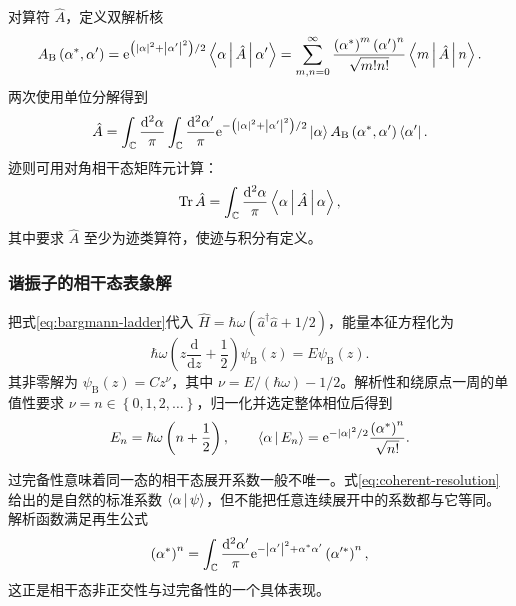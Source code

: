 对算符 $\hat A$，定义双解析核
\begin{equation}
A_{\mathrm{B}}\left(\alpha^*,\alpha'\right)
=\mathrm{e}^{\left(\left|\alpha\right|^2+\left|\alpha'\right|^2\right)/2}
\Braket{\alpha|\hat A|\alpha'}
=\sum_{m,n=0}^{\infty}\frac{\left(\alpha^*\right)^m\left(\alpha'\right)^n}{\sqrt{m!n!}}
\Braket{m|\hat A|n}.
\end{equation}
两次使用单位分解得到
\begin{equation}
\hat A=\int_{\mathbb{C}}\frac{\mathrm{d}^2\alpha}{\pi}
\int_{\mathbb{C}}\frac{\mathrm{d}^2\alpha'}{\pi}
\mathrm{e}^{-\left(\left|\alpha\right|^2+\left|\alpha'\right|^2\right)/2}
\Ket{\alpha}A_{\mathrm{B}}\left(\alpha^*,\alpha'\right)\Bra{\alpha'}.
\end{equation}
迹则可用对角相干态矩阵元计算：
\begin{equation}
\mathrm{Tr}\,\hat A=\int_{\mathbb{C}}\frac{\mathrm{d}^2\alpha}{\pi}\Braket{\alpha|\hat A|\alpha},
\end{equation}
其中要求 $\hat A$ 至少为迹类算符，使迹与积分有定义。

\subsubsection{谐振子的相干态表象解}
把式\eqref{eq:bargmann-ladder}代入
$\hat H=\hbar\omega\left(\hat a^\dagger\hat a+1/2\right)$，能量本征方程化为
\begin{equation}
\hbar\omega\left(z\frac{\mathrm{d}}{\mathrm{d}z}+\frac12\right)
\psi_{\mathrm{B}}\left(z\right)=E\psi_{\mathrm{B}}\left(z\right).
\end{equation}
其非零解为 $\psi_{\mathrm{B}}\left(z\right)=Cz^\nu$，其中
$\nu=E/\left(\hbar\omega\right)-1/2$。解析性和绕原点一周的单值性要求
$\nu=n\in\left\{0,1,2,\ldots\right\}$，归一化并选定整体相位后得到
\begin{equation}
E_n=\hbar\omega\left(n+\frac12\right),
\qquad
\Braket{\alpha|E_n}=\mathrm{e}^{-\left|\alpha\right|^2/2}
\frac{\left(\alpha^*\right)^n}{\sqrt{n!}}.
\end{equation}

过完备性意味着同一态的相干态展开系数一般不唯一。式\eqref{eq:coherent-resolution}给出的是自然的标准系数 $\Braket{\alpha|\psi}$，但不能把任意连续展开中的系数都与它等同。解析函数满足再生公式
\begin{equation}
\left(\alpha^*\right)^n
=\int_{\mathbb{C}}\frac{\mathrm{d}^2\alpha'}{\pi}
\mathrm{e}^{-\left|\alpha'\right|^2+\alpha^*\alpha'}
\left(\alpha'^*\right)^n,
\end{equation}
这正是相干态非正交性与过完备性的一个具体表现。

